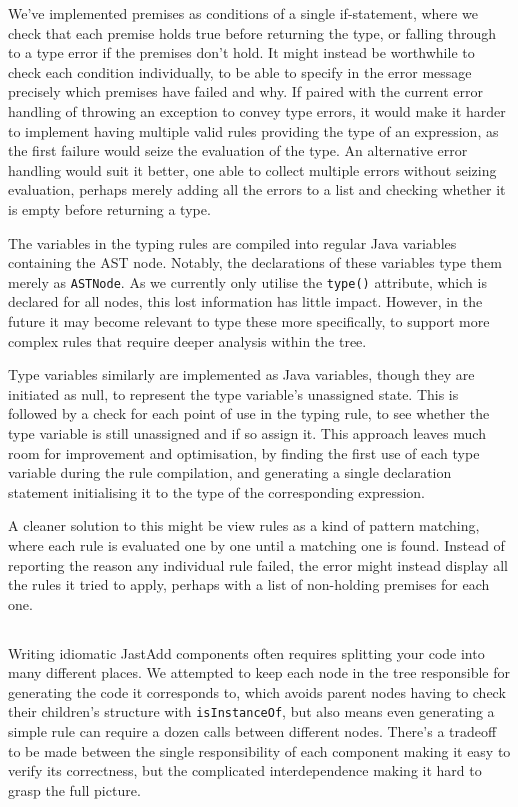 \documentclass[nofilelist]{cslthse-msc}
\begin{document}
We've implemented premises as conditions of a single if-statement, where we check that each premise holds true before returning the type, or falling through to a type error if the premises don't hold.
It might instead be worthwhile to check each condition individually, to be able to specify in the error message precisely which premises have failed and why.
If paired with the current error handling of throwing an exception to convey type errors, it would make it harder to implement having multiple valid rules providing the type of an expression, as the first failure would seize the evaluation of the type.
An alternative error handling would suit it better, one able to collect multiple errors without seizing evaluation, perhaps merely adding all the errors to a list and checking whether it is empty before returning a type.

The variables in the typing rules are compiled into regular Java variables containing the AST node.
Notably, the declarations of these variables type them merely as \verb|ASTNode|.
As we currently only utilise the \lstinline{type()} attribute, which is declared for all nodes, this lost information has little impact.
However, in the future it may become relevant to type these more specifically, to support more complex rules that require deeper analysis within the tree.

Type variables similarly are implemented as Java variables, though they are initiated as null, to represent the type variable's unassigned state.
This is followed by a check for each point of use in the typing rule, to see whether the type variable is still unassigned and if so assign it.
This approach leaves much room for improvement and optimisation, by finding the first use of each type variable during the rule compilation, and generating a single declaration statement initialising it to the type of the corresponding expression.

A cleaner solution to this might be view rules as a kind of pattern matching, where each rule is evaluated one by one until a matching one is found.
Instead of reporting the reason any individual rule failed, the error might instead display all the rules it tried to apply, perhaps with a list of non-holding premises for each one.

\subsection{\rqthree}
Writing idiomatic JastAdd components often requires splitting your code into many different places.
We attempted to keep each node in the tree responsible for generating the code it corresponds to, which avoids parent nodes having to check their children's structure with \verb|isInstanceOf|, but also means even generating a simple rule can require a dozen calls between different nodes.
There's a tradeoff to be made between the single responsibility of each component making it easy to verify its correctness, but the complicated interdependence making it hard to grasp the full picture.
\end{document}
